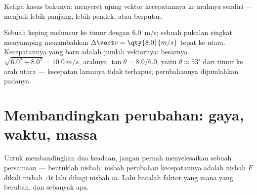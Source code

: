 \begin{omfigure}
\qquad
{}
\qquad
{}

{\small Ketiga kasus bakunya:  menyeret ujung vektor
kecepatannya ke arahnya sendiri --- menjadi lebih panjang, lebih
pendek, atau berputar.}
\end{omfigure}

\begin{example}\label{ex:g11:forces-and-motion:kick}
Sebuah keping meluncur ke timur dengan \qty{6.0}{m/s}; sebuah pukulan
singkat menyamping menambahkan $\Delta\vect v = \qty{8.0}{m/s}$ tepat
ke utara. Kecepatannya yang baru adalah jumlah vektornya: besarnya
$\sqrt{6.0^2 + 8.0^2} = \qty{10.0}{m/s}$, arahnya
$\tan\theta = 8.0/6.0$, yaitu $\theta \approx 53^\circ$ dari timur ke
arah utara --- kecepatan lamanya tidak terhapus, perubahannya
dijumlahkan padanya.
\end{example}

\section{Membandingkan perubahan: gaya, waktu, massa}

\begin{method}\label{met:g11:forces-and-motion:ratio}
Untuk membandingkan dua keadaan, jangan pernah menyelesaikan sebuah
persamaan --- bentuklah nisbah: nisbah perubahan kecepatannya adalah
nisbah $F$ dikali nisbah $\Delta t$ lalu dibagi nisbah $m$. Lalu bacalah
faktor yang mana yang berubah, dan sebanyak apa.
\end{method}

